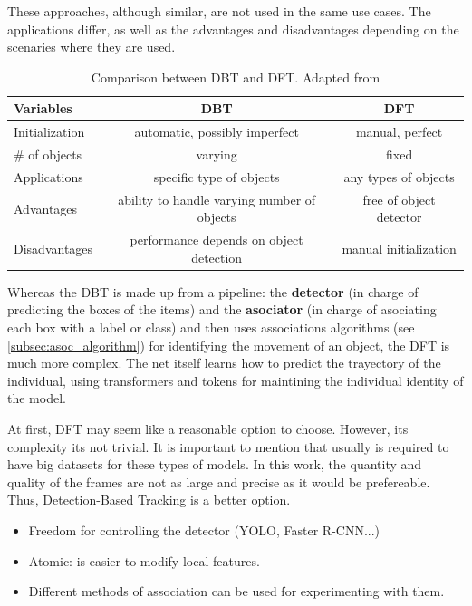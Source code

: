 \documentclass[12pt]{report} %
\begin{document}
These approaches, although similar, are not used in the same use cases. The applications differ, as well as the advantages and disadvantages depending on the scenaries where they are used.

\begin{table}[H]
    \centering
        \begin{tabular}{lcc}
        \toprule
        \textbf{Variables} & \textbf{DBT} & \textbf{DFT} \\
        \midrule
        Initialization & automatic, possibly imperfect & manual, perfect \\
        \# of objects & varying & fixed \\
        Applications & specific type of objects & any types of objects \\
        Advantages & ability to handle varying number of objects & free of object detector \\
        Disadvantages & performance depends on object detection & manual initialization \\    
		\bottomrule
    \end{tabular}
    \caption{Comparison between DBT and DFT. Adapted from \cite{LUO2021103448}}
    \label{tab:dbt_vs_dft}
\end{table}

Whereas the DBT is made up from a pipeline: the \textbf{detector} (in charge of predicting the boxes of the items) and the \textbf{asociator} (in charge of asociating each box with a label or class) and then uses associations algorithms (see \ref{subsec:asoc_algorithm}) for identifying the movement of an object, the DFT is much more complex. The net itself learns how to predict the trayectory of the individual, using transformers and tokens for maintining the individual identity of the model.

At first, DFT may seem like a reasonable option to choose. However, its complexity its not trivial. It is important to mention that usually is required to have big datasets for these types of models. In this work, the quantity and quality of the frames are not as large and precise as it would be prefereable. Thus, Detection-Based Tracking is a better option.

\begin{itemize}
	\item Freedom for controlling the detector (YOLO, Faster R-CNN...)
	\item Atomic: is easier to modify local features.
	\item Different methods of association can be used for experimenting with them.
\end{itemize}
\end{document}
